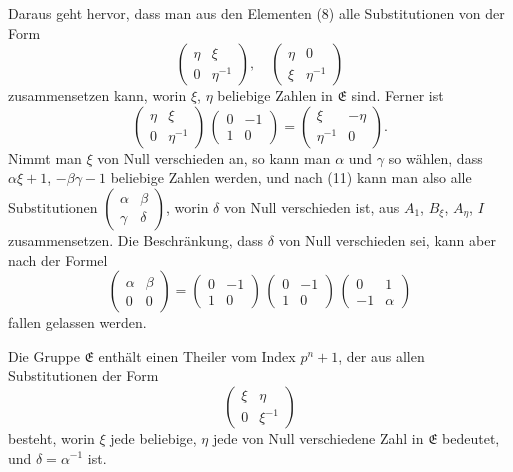 \documentclass[12pt,a4paper]{article}
\begin{document}
Daraus geht hervor, dass man aus den Elementen (8) alle Substitutionen von der Form
\[
\begin{pmatrix}\eta&\xi\\0&\eta^{-1}\end{pmatrix},\quad
\begin{pmatrix}\eta&0\\\xi&\eta^{-1}\end{pmatrix}
\]
zusammensetzen kann, worin $\xi$, $\eta$ beliebige Zahlen in $\mathfrak{E}$ sind. Ferner ist
\begin{equation}\label{eq:65.11}
\tag{11}
\begin{pmatrix}\eta&\xi\\0&\eta^{-1}\end{pmatrix}\,
\begin{pmatrix}0&-1\\1&0\end{pmatrix}
= \begin{pmatrix}\xi&-\eta\\\eta^{-1}&0\end{pmatrix}.
\end{equation}
Nimmt man $\xi$ von Null verschieden an, so kann man $\alpha$ und $\gamma$ so wählen, dass $\alpha\xi + 1$, $-\beta\gamma - 1$ beliebige Zahlen werden, und nach (11) kann man also alle Substitutionen $\begin{pmatrix}\alpha&\beta\\\gamma&\delta\end{pmatrix}$, worin $\delta$ von Null verschieden ist, aus $A_{1}$, $B_{\xi}$, $A_{\eta}$, $I$ zusammensetzen. Die Beschränkung, dass $\delta$ von Null verschieden sei, kann aber nach der Formel
\[
\begin{pmatrix}\alpha&\beta\\0&0\end{pmatrix}
= \begin{pmatrix}0&-1\\1&0\end{pmatrix}\,
\begin{pmatrix}0&-1\\1&0\end{pmatrix}\,
\begin{pmatrix}0&1\\-1&\alpha\end{pmatrix}
\]
fallen gelassen werden.

\newpage
{}

Die Gruppe $\mathfrak{E}$ enthält einen Theiler vom Index $p^{n} + 1$, der aus allen Substitutionen der Form
\[
\begin{pmatrix}\xi&\eta\\0&\xi^{-1}\end{pmatrix}
\]
besteht, worin $\xi$ jede beliebige, $\eta$ jede von Null verschiedene Zahl in $\mathfrak{E}$ bedeutet, und $\delta = \alpha^{-1}$ ist.
\end{document}
